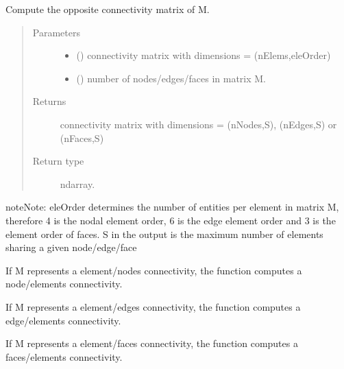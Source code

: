 \documentclass[letterpaper,10pt,english]{sphinxmanual}
\begin{document}

\begin{fulllineitems}
\label{\detokenize{petgem/vectors:petgem.vectors.invConnectivity}}
Compute the opposite connectivity matrix of M.
\begin{quote}\begin{description}
\item[{Parameters}] \leavevmode\begin{itemize}
\item {} 
 () \textendash{} connectivity matrix with dimensions = (nElems,eleOrder)

\item {} 
 () \textendash{} number of nodes/edges/faces in matrix M.

\end{itemize}

\item[{Returns}] \leavevmode
connectivity matrix with dimensions = (nNodes,S), (nEdges,S) or (nFaces,S)

\item[{Return type}] \leavevmode
ndarray.

\end{description}\end{quote}

\begin{sphinxadmonition}{note}{Note:}
eleOrder determines the number of entities per element in matrix M,
therefore 4 is the nodal element order, 6 is the edge element order and
3 is the element order of faces.
S in the output is the maximum number of elements sharing a given node/edge/face

If M represents a element/nodes connectivity, the function computes
a node/elements connectivity.

If M represents a element/edges connectivity, the function computes
a edge/elements connectivity.

If M represents a element/faces connectivity, the function computes
a faces/elements connectivity.
\end{sphinxadmonition}

\end{fulllineitems}
\end{document}
